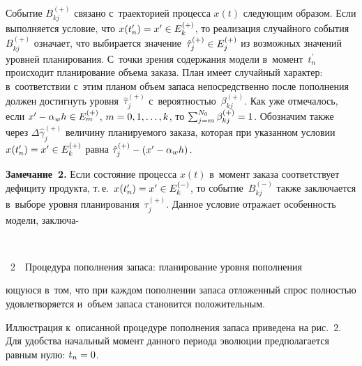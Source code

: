 \begin{multicols}{2}
  Событие $B_{kj}^{(+)}$ связано с~траекторией процесса $x(t)$ следующим 
образом. Если выполняется условие, что $x(t_n^\prime)\hm= x^\prime\hm\in 
E_k^{(+)}$, то реализация случайного события $B_{kj}^{(+)}$ означает, что 
выбирается значение~$\hat{\tau}_j^{(+)}\hm\in E_j^{(+)}$ из возможных 
значений уровней планирования. С~точки зрения содержания модели 
в~момент~$t_n^\prime$ происходит планирование объема заказа. План имеет 
случайный характер: в~соответствии с~этим планом объем запаса 
непосредственно после пополнения должен достигнуть 
уровня~$\hat{\tau}_j^{(+)}$ с~вероятностью~$\beta_{kj}^{(+)}$. Как уже 
отмечалось, если $x^\prime\hm- \alpha_w h\hm\in E_m^{(+)}$, $m\hm = 0, 1, 
\ldots, k$, то $\sum\nolimits_{j=m}^{N_0} \beta_{kj}^{(+)}\hm=1$. Обозначим
также через $\Delta \hat{\gamma}_j^{(+)}$ величину 
планируемого заказа, которая при указанном условии $x(t_n^\prime)\hm= x^\prime\hm\in 
E_k^{(+)}$ равна $\hat{\tau}_j^{(+)}\hm- \left( x^\prime\hm- \alpha_w 
h\right).$
  
  \smallskip
  
  \noindent
  \textbf{Замечание~2.} Если состояние процесса $x(t)$ в~момент заказа 
соответствует дефициту продукта, т.\,е.\ $x(t_n^\prime)\hm= 
x^\prime\hm\in E_k^{(-)}$, то событие~$B_{kj}^{(-)}$ также заключается 
в~выборе уровня планирования~$\tau_j^{(+)}$. Данное условие отражает 
особенность модели, за\-клю\-ча-\linebreak\vspace*{-12pt}
  
{ \begin{center}  %
 \vspace*{-2pt}
  \mbox{%
 \epsfxsize=64mm 
 }


\end{center}

\vspace*{-5pt}


\noindent
{{\figurename~2}\ \ \small{Процедура пополнения запаса: планирование уровня пополнения}}
}

\vspace*{10pt}


\noindent
ющу\-юся в~том, что при каждом пополнении 
запаса отложенный спрос полностью удовлетворяется и~объем запаса 
становится положительным.

  Иллюстрация к~описанной процедуре пополнения запаса приведена на 
рис.~2. Для удобства начальный момент данного периода эволюции 
предполагается равным нулю: $t_n\hm=0$. 
  

\end{multicols}
